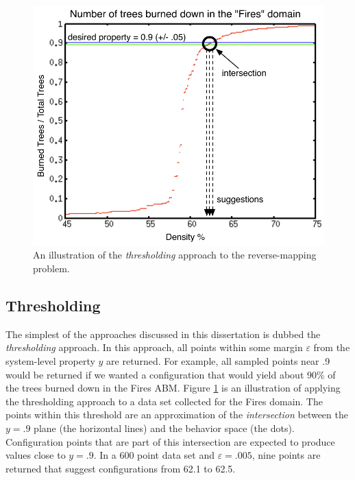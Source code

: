 \begin{figure}[ht]
\centering
\includegraphics[scale=.66666667]{images/firesthreshold.pdf}
\caption{An illustration of the \textit{thresholding} approach to the reverse-mapping problem.}
\label{fig:firethresh}
\end{figure}

\subsection{Thresholding}

The simplest of the approaches discussed in this dissertation is dubbed the \textit{thresholding} approach.
In this approach, all points within some margin $\varepsilon$ from the system-level property $y$ are returned.
For example, all sampled points near .9 would be returned if we wanted a configuration that would yield about 90\% of the trees burned down in the Fires ABM.
Figure \ref{fig:firethresh} is an illustration of applying the thresholding approach to a data set collected for the Fires domain.
The points within this threshold are an approximation of the \textit{intersection} between the $y=.9$ plane (the horizontal lines) and the behavior space (the dots).
Configuration points that are part of this intersection are expected to produce values close to $y=.9$.
In a 600 point data set and $\varepsilon=.005$, nine points are returned that suggest configurations from 62.1 to 62.5.

